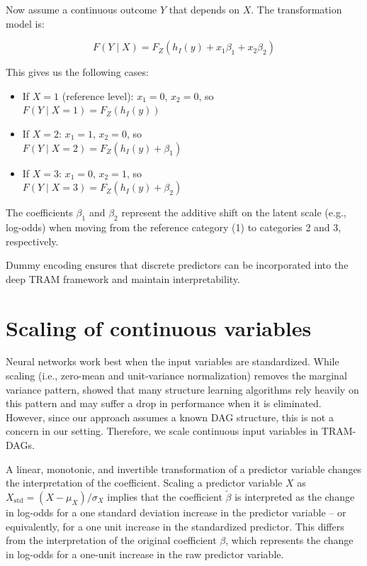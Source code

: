 Now assume a continuous outcome $Y$ that depends on $X$. The transformation model is:

\[
F(Y \mid X) = F_Z(h_I(y) + x_1 \beta_1 + x_2 \beta_2)
\]

This gives us the following cases:
\begin{itemize}
  \item If $X = 1$ (reference level): $x_1 = 0$, $x_2 = 0$, so \\
  $F(Y \mid X=1) = F_Z(h_I(y))$
  \item If $X = 2$: $x_1 = 1$, $x_2 = 0$, so \\
  $F(Y \mid X=2) = F_Z(h_I(y) + \beta_1)$
  \item If $X = 3$: $x_1 = 0$, $x_2 = 1$, so \\
  $F(Y \mid X=3) = F_Z(h_I(y) + \beta_2)$
\end{itemize}

The coefficients $\beta_1$ and $\beta_2$ represent the additive shift on the latent scale (e.g., log-odds) when moving from the reference category (1) to categories 2 and 3, respectively.

Dummy encoding ensures that discrete predictors can be incorporated into the deep TRAM framework and maintain interpretability.



\section{Scaling of continuous variables} \label{sec:scaling_continuous_variables}



Neural networks work best when the input variables are standardized. While scaling (i.e., zero-mean and unit-variance normalization) removes the marginal variance pattern, \citet{reisach2021} showed that many structure learning algorithms rely heavily on this pattern and may suffer a drop in performance when it is eliminated. However, since our approach assumes a known DAG structure, this is not a concern in our setting. Therefore, we scale continuous input variables in TRAM-DAGs.

A linear, monotonic, and invertible transformation of a predictor variable changes the interpretation of the coefficient. Scaling a predictor variable $X$ as $X_{\text{std}} = (X - \mu_X) / \sigma_X$ implies that the coefficient $\tilde{\beta}$ is interpreted as the change in log-odds for a one standard deviation increase in the predictor variable -- or equivalently, for a one unit increase in the standardized predictor. This differs from the interpretation of the original coefficient $\beta$, which represents the change in log-odds for a one-unit increase in the raw predictor variable.


